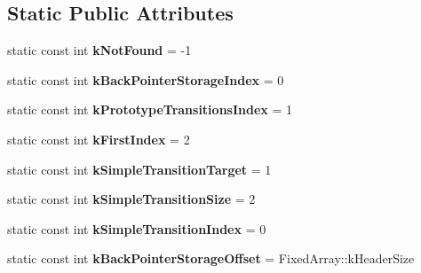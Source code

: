 \subsection*{Static Public Attributes}
\begin{DoxyCompactItemize}
\item 
\hypertarget{classv8_1_1internal_1_1_transition_array_a7d68801878e5dc9587483ec914d7522b}{}static const int {\bfseries k\+Not\+Found} = -\/1\label{classv8_1_1internal_1_1_transition_array_a7d68801878e5dc9587483ec914d7522b}

\item 
\hypertarget{classv8_1_1internal_1_1_transition_array_aa5c517eb50118b9cd7c9e37ac37bcd19}{}static const int {\bfseries k\+Back\+Pointer\+Storage\+Index} = 0\label{classv8_1_1internal_1_1_transition_array_aa5c517eb50118b9cd7c9e37ac37bcd19}

\item 
\hypertarget{classv8_1_1internal_1_1_transition_array_af384db47b8e7c19b376a81f4e1361344}{}static const int {\bfseries k\+Prototype\+Transitions\+Index} = 1\label{classv8_1_1internal_1_1_transition_array_af384db47b8e7c19b376a81f4e1361344}

\item 
\hypertarget{classv8_1_1internal_1_1_transition_array_a1c836938acaf06ce7778b30631cfaf86}{}static const int {\bfseries k\+First\+Index} = 2\label{classv8_1_1internal_1_1_transition_array_a1c836938acaf06ce7778b30631cfaf86}

\item 
\hypertarget{classv8_1_1internal_1_1_transition_array_aa77977896d05c847e4f6b6a9271efb81}{}static const int {\bfseries k\+Simple\+Transition\+Target} = 1\label{classv8_1_1internal_1_1_transition_array_aa77977896d05c847e4f6b6a9271efb81}

\item 
\hypertarget{classv8_1_1internal_1_1_transition_array_aa75e87f7d0935108c2b2b08c59fdcf82}{}static const int {\bfseries k\+Simple\+Transition\+Size} = 2\label{classv8_1_1internal_1_1_transition_array_aa75e87f7d0935108c2b2b08c59fdcf82}

\item 
\hypertarget{classv8_1_1internal_1_1_transition_array_a1c9a5eb75bff5c8f0746d28ae983e844}{}static const int {\bfseries k\+Simple\+Transition\+Index} = 0\label{classv8_1_1internal_1_1_transition_array_a1c9a5eb75bff5c8f0746d28ae983e844}

\item 
\hypertarget{classv8_1_1internal_1_1_transition_array_a5ad73dcd14ea8545e85d15a9e8186145}{}static const int {\bfseries k\+Back\+Pointer\+Storage\+Offset} = Fixed\+Array\+::k\+Header\+Size\label{classv8_1_1internal_1_1_transition_array_a5ad73dcd14ea8545e85d15a9e8186145}


\end{DoxyCompactItemize}
